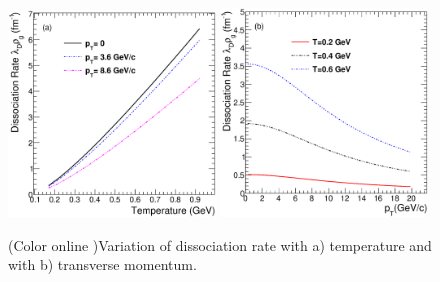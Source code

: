 \documentclass[aps,prc,preprint,superscriptaddress,showpacs,showkeys]{revtex4-1}
\begin{document}
\begin{figure}
\includegraphics[width=0.49\textwidth]{Fig3a_DRateVsT.eps}
\includegraphics[width=0.49\textwidth]{Fig3b_DRateVsPt.eps}
\caption{(Color online )Variation of dissociation rate with a) temperature and with b) transverse momentum.}
\label{fig:DRateVsTempAndPt}
\end{figure}
\end{document}
